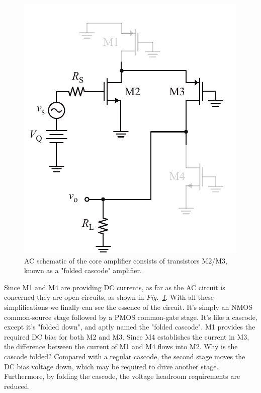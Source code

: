 \begin{figure}[tb]
\centering
\includegraphics[scale=1]{19cascode_folded_ac}
\caption{AC schematic of the core amplifier consists of transistors M2/M3, known as a "folded cascode" amplifier.}
\label{fig:19cascode_folded_ac}
\end{figure}
Since M1 and M4 are providing DC currents, as far as the AC circuit is concerned they are open-circuits, as shown in \emph{Fig.~\ref{fig:19cascode_folded_ac}}.  With all these simplifications we finally can see the essence of the circuit. It's simply an NMOS common-source stage followed by a PMOS common-gate stage.  It's like a cascode, except it's "folded down", and aptly named the "folded cascode".  M1 provides the required DC bias for both M2 and M3.  Since M4 establishes the current in M3, the difference between the current of M1 and M4 flows into M2.
Why is the cascode folded?  Compared with a regular cascode, the second stage moves the DC bias voltage down, which may be required to drive another stage.  Furthermore, by folding the cascode, the voltage headroom requirements are reduced.
